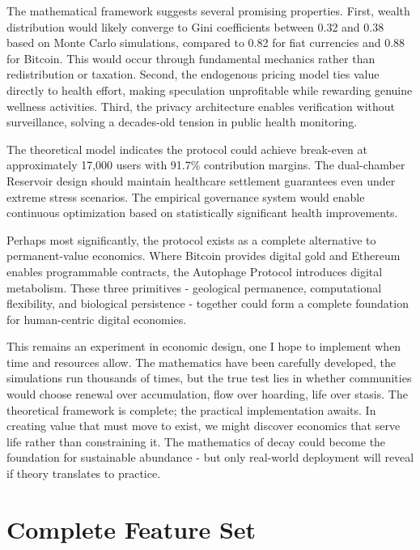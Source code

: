 \documentclass[11pt,letterpaper]{article}
\begin{document}
The mathematical framework suggests several promising properties. First, wealth distribution would likely converge to Gini coefficients between 0.32 and 0.38 based on Monte Carlo simulations, compared to 0.82 for fiat currencies and 0.88 for Bitcoin. This would occur through fundamental mechanics rather than redistribution or taxation. Second, the endogenous pricing model ties value directly to health effort, making speculation unprofitable while rewarding genuine wellness activities. Third, the privacy architecture enables verification without surveillance, solving a decades-old tension in public health monitoring.

The theoretical model indicates the protocol could achieve break-even at approximately 17,000 users with 91.7\% contribution margins. The dual-chamber Reservoir design should maintain healthcare settlement guarantees even under extreme stress scenarios. The empirical governance system would enable continuous optimization based on statistically significant health improvements.

Perhaps most significantly, the protocol exists as a complete alternative to permanent-value economics. Where Bitcoin provides digital gold and Ethereum enables programmable contracts, the Autophage Protocol introduces digital metabolism. These three primitives - geological permanence, computational flexibility, and biological persistence - together could form a complete foundation for human-centric digital economies.

This remains an experiment in economic design, one I hope to implement when time and resources allow. The mathematics have been carefully developed, the simulations run thousands of times, but the true test lies in whether communities would choose renewal over accumulation, flow over hoarding, life over stasis. The theoretical framework is complete; the practical implementation awaits. In creating value that must move to exist, we might discover economics that serve life rather than constraining it. The mathematics of decay could become the foundation for sustainable abundance - but only real-world deployment will reveal if theory translates to practice.

\appendix

\section{Complete Feature Set}
\end{document}
